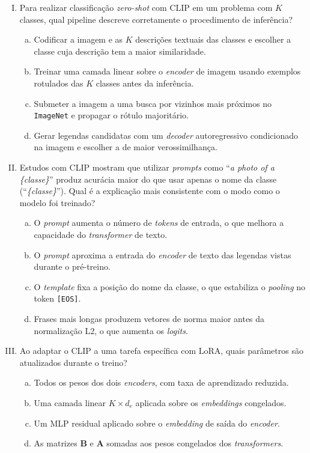 \documentclass{dlproblemset}
\begin{document}
\begin{enumerate}[I)]
    \item Para realizar classificação \textit{zero-shot} com CLIP em um problema com $K$ classes, qual pipeline descreve corretamente o procedimento de inferência?
    \begin{enumerate}[(a)]
        \item Codificar a imagem e as $K$ descrições textuais das classes e escolher a classe cuja descrição tem a maior similaridade.
        \item Treinar uma camada linear sobre o \textit{encoder} de imagem usando exemplos rotulados das $K$ classes antes da inferência.
        \item Submeter a imagem a uma busca por vizinhos mais próximos no \texttt{ImageNet} e propagar o rótulo majoritário.
        \item Gerar legendas candidatas com um \textit{decoder} autoregressivo condicionado na imagem e escolher a de maior verossimilhança.
    \end{enumerate}

    \item Estudos com CLIP mostram que utilizar \textit{prompts} como ``\textit{a photo of a \{classe\}}'' produz acurácia maior do que usar apenas o nome da classe (``\textit{\{classe\}}''). Qual é a explicação mais consistente com o modo como o modelo foi treinado?
    \begin{enumerate}[(a)]
        \item O \textit{prompt} aumenta o número de \textit{tokens} de entrada, o que melhora a capacidade do \textit{transformer} de texto.
        \item O \textit{prompt} aproxima a entrada do \textit{encoder} de texto das legendas vistas durante o pré-treino.
        \item O \textit{template} fixa a posição do nome da classe, o que estabiliza o \textit{pooling} no token \texttt{[EOS]}.
        \item Frases mais longas produzem vetores de norma maior antes da normalização L2, o que aumenta os \textit{logits}.
    \end{enumerate}

    \item Ao adaptar o CLIP a uma tarefa específica com LoRA, quais parâmetros são atualizados durante o treino?
    \begin{enumerate}[(a)]
        \item Todos os pesos dos dois \textit{encoders}, com taxa de aprendizado reduzida.
        \item Uma camada linear $K \times d_e$ aplicada sobre os \textit{embeddings} congelados.
        \item Um MLP residual aplicado sobre o \textit{embedding} de saída do \textit{encoder}.
        \item As matrizes $\mathbf{B}$ e $\mathbf{A}$ somadas aos pesos congelados dos \textit{transformers}.
    \end{enumerate}


\end{enumerate}
\end{document}
